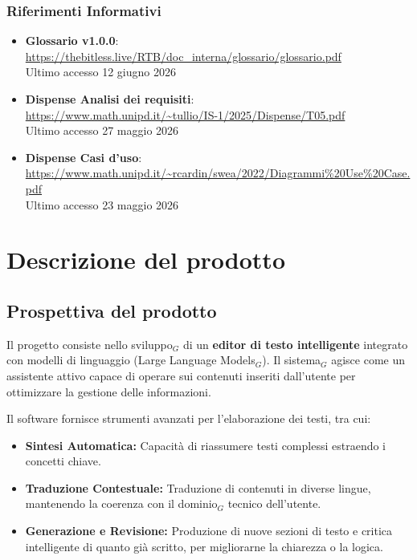 \documentclass[a4paper, 10pt]{article}
\begin{document}
\subsubsection{Riferimenti Informativi}
\begin{itemize}
    \item \textbf{Glossario v1.0.0}: \\
    \url{https://thebitless.live/RTB/doc_interna/glossario/glossario.pdf} \allowbreak \\
    Ultimo accesso 12 giugno 2026
    \item \textbf{Dispense Analisi dei requisiti}: \\
    \url{https://www.math.unipd.it/~tullio/IS-1/2025/Dispense/T05.pdf} \\
    Ultimo accesso 27 maggio 2026
    \item \textbf{Dispense Casi d'uso}: \\
    \url{https://www.math.unipd.it/~rcardin/swea/2022/Diagrammi%20Use%20Case.pdf} \\
    Ultimo accesso 23 maggio 2026
\end{itemize}

\newpage

\section{Descrizione del prodotto}

\subsection{Prospettiva del prodotto}
Il progetto consiste nello sviluppo$_G$ di un \textbf{editor di testo intelligente} integrato con modelli di linguaggio (Large Language Models$_G$). Il sistema$_G$ agisce come un assistente attivo capace di operare sui contenuti inseriti dall'utente per ottimizzare la gestione delle informazioni.

Il software fornisce strumenti avanzati per l'elaborazione dei testi, tra cui:
\begin{itemize}
    \item \textbf{Sintesi Automatica:} Capacità di riassumere testi complessi estraendo i concetti chiave.
    \item \textbf{Traduzione Contestuale:} Traduzione di contenuti in diverse lingue, mantenendo la coerenza con il dominio$_G$ tecnico dell'utente.
    \item \textbf{Generazione e Revisione:} Produzione di nuove sezioni di testo e critica intelligente di quanto già scritto, per migliorarne la chiarezza o la logica.
\end{itemize}
\end{document}
